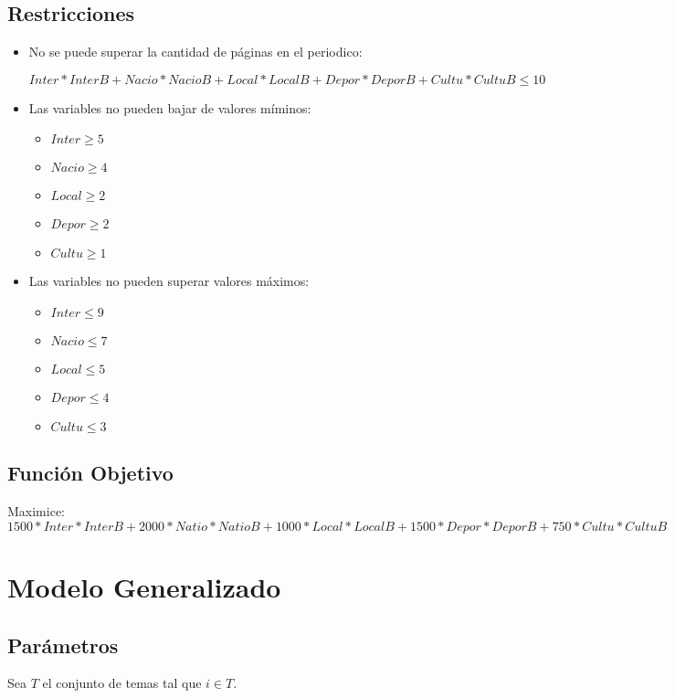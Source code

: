 \documentclass{article}
\begin{document}
\subsection{Restricciones}
\begin{itemize}
    \item No se puede superar la cantidad de páginas en el periodico:
    
    $Inter*InterB + Nacio*NacioB + Local*LocalB + Depor*DeporB + Cultu*CultuB \leq 10$
    
    \item Las variables no pueden bajar de valores míminos:
    \begin{itemize}
        \item $Inter \geq 5$
        \item $Nacio \geq 4$
        \item $Local \geq 2$
        \item $Depor \geq 2$
        \item $Cultu \geq 1$
    \end{itemize}
    \item Las variables no pueden superar valores máximos:
    \begin{itemize}
        \item $Inter \leq 9$
        \item $Nacio \leq 7$
        \item $Local \leq 5$
        \item $Depor \leq 4$
        \item $Cultu \leq 3$
    \end{itemize}
\end{itemize}

\subsection{Función Objetivo}

Maximice: $1500*Inter*InterB + 2000*Natio*NatioB + 1000*Local*LocalB + 1500*Depor*DeporB + 750*Cultu*CultuB$

\section{Modelo Generalizado}
\subsection{Parámetros}

Sea $T$ el conjunto de temas tal que $i \in T$.
\end{document}
